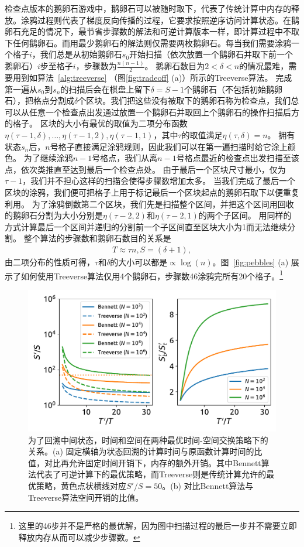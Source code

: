 \documentclass[A4,twoside,UTF8]{ctexart}
\begin{document}
检查点版本的鹅卵石游戏中，鹅卵石可以被随时取下，代表了传统计算中内存的释放。涂鸦过程则代表了梯度反向传播的过程，它要求按照逆序访问计算状态。在鹅卵石充足的情况下，最节省步骤数的解法和可逆计算版本一样，即计算过程中不取下任何鹅卵石。而用最少鹅卵石的解法则仅需要两枚鹅卵石。每当我们需要涂鸦一个格子$i$，我们总是从初始鹅卵石$s_0$开始扫描（依次放置一个鹅卵石并取下前一个鹅卵石）$i$步至格子$i$，步骤数为$\frac{n(n-1)}{2}$。
鹅卵石数目为$2<\delta<n$的情况最难，需要用到如算法~\ref{alg:treeverse} （图\ref{fig:tradeoff} (a)）所示的Treeverse算法。
完成第一遍从$s_0$到$s_{n}$的扫描后会在棋盘上留下$\delta=S-1$个鹅卵石（不包括初始鹅卵石），把格点分割成$\delta$个区块。我们把这些没有被取下的鹅卵石称为检查点，我们总可以从任意一个检查点出发通过放置一个鹅卵石并取回上个鹅卵石的操作扫描后方的格子。
区块的大小有最优的取值为二项分布函数$\eta(\tau-1, \delta), \ldots, \eta(\tau-1, 2), \eta(\tau-1, 1)$，其中$\tau$的取值满足$\eta(\tau, \delta) = n$。
拥有状态$s_{n}$后，$n$号格子直接满足涂鸦规则，因此我们可以在第一遍扫描时给它涂上颜色。
为了继续涂鸦$n-1$号格点，我们从离$n-1$号格点最近的检查点出发扫描至该点，依次类推直至达到最后一个检查点处。
由于最后一个区块尺寸最小，仅为$\tau-1$，我们并不担心这样的扫描会使得步骤数增加太多。
当我们完成了最后一个区块的涂鸦，我们便可把格子上用于标记最后一个区块起点的鹅卵石取下以便重复利用。
为了涂鸦倒数第二个区块，我们先是扫描整个区间，并把这个区间用回收的鹅卵石分割为大小分别是$\eta(\tau-2, 2)$和$\eta(\tau-2, 1)$的两个子区间。
用同样的方式计算最后一个区间并递归的分割前一个子区间直至区块大小为1而无法继续分割。
整个算法的步骤数和鹅卵石数目的关系是
\begin{align}
    T \approx \tau n, S = (\delta+1),
\end{align}
由二项分布的性质可得，$\tau$和$\delta$的大小可以都是$\propto\log(n)$。图~\ref{fig:pebbles} (a) 展示了如何使用Treeverse算法仅用4个鹅卵石，步骤数46涂鸦完所有20个格子。\footnote{这里的46步并不是严格的最优解，因为图中扫描过程的最后一步并不需要立即释放内存从而可以减少步骤数。}

\begin{figure}[h]
\centering
\includegraphics[width=0.8\columnwidth]{./fig1.pdf}
    \caption{为了回溯中间状态，时间和空间在两种最优时间-空间交换策略下的关系。(a) 固定横轴为状态回溯的计算时间与原函数计算时间的比值，对比再允许固定时间开销下，内存的额外开销。其中Bennett算法代表了可逆计算下的最优策略，而Treeverse则是传统计算允许的最优策略，黄色点状横线对应$S'/S=50$。(b) 对比Bennett算法与Treeverse算法空间开销的比值。\label{fig:timespace}}
\end{figure}
\end{document}
